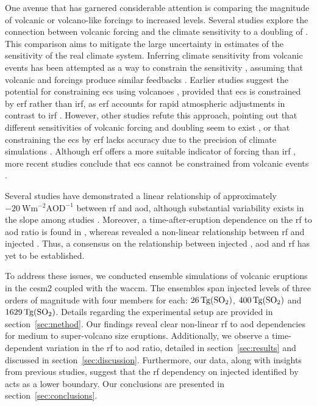\documentclass{ametsocV6.1}
\newcommand{\iso}[1][i]{{#1}njected \ce{SO2}}
\begin{document}
One avenue that has garnered considerable attention is comparing the magnitude of
volcanic or volcano-like forcings to increased  levels. Several studies explore
the connection between volcanic forcing and the climate sensitivity to a doubling of
\citep{boer2007,marvel2016,merlis2014,ollila2016,richardson2019,salvi2022,wigley2005}.
This comparison aims to mitigate the large uncertainty in estimates of the sensitivity
of the real climate system. Inferring climate sensitivity from volcanic events has been
attempted as a way to constrain the sensitivity \citep{boer2007}, assuming that volcanic
and  forcings produce similar feedbacks \citep{pauling2023}. Earlier studies
suggest the potential for constraining \gls{ecs} using volcanoes \citep{bender2010},
provided that \gls{ecs} is constrained by \gls{erf} rather than \gls{irf}, as \gls{erf}
accounts for rapid atmospheric adjustments in contrast to \gls{irf}
\citep{richardson2019}. However, other studies refute this approach, pointing out that
different sensitivities of volcanic forcing and  doubling seem to exist
\citep{douglass2006}, or that constraining the \gls{ecs} by \gls{erf} lacks accuracy due
to the precision of climate simulations \citep{boer2007,salvi2022}. Although \gls{erf}
offers a more suitable indicator of forcing than \gls{irf}
\citep{marvel2016,richardson2019}, more recent studies conclude that \gls{ecs} cannot be
constrained from volcanic events \citep{pauling2023}.

Several studies have demonstrated a linear relationship of approximately
\(-\SI{20}{\watt\metre^{-2}\mathrm{AOD}^{-1}}\) between \gls{rf} and \gls{aod}, although
substantial variability exists in the slope among studies
\citep{mills2017,hansen2005,gregory2016,marshall2020,pitari2016b}. Moreover, a
time-after-eruption dependence on the \gls{rf} to \gls{aod} ratio is found in
\citet{marshall2020}, whereas \citet{niemeier2015} revealed a non-linear relationship
between \gls{rf} and \iso{}. Thus, a consensus on the relationship between \iso{},
\gls{aod} and \gls{rf} has yet to be established.

To address these issues, we conducted ensemble simulations of volcanic eruptions in the
\gls{cesm2} coupled with the \gls{waccm}. The ensembles span \iso{} levels of three
orders of magnitude with four members for each: \(\SI{26}{\tera\gram(\ce{SO2})}\),
\(\SI{400}{\tera\gram(\ce{SO2})}\) and \(\SI{1629}{\tera\gram(\ce{SO2})}\). Details
regarding the experimental setup are provided in section~\ref{sec:method}. Our findings
reveal clear non-linear \gls{rf} to \gls{aod} dependencies for medium to super-volcano
size eruptions. Additionally, we observe a time-dependent variation in the \gls{rf} to
\gls{aod} ratio, detailed in section~\ref{sec:results} and discussed in
section~\ref{sec:discussion}. Furthermore, our data, along with insights from previous
studies, suggest that the \gls{rf} dependency on \iso{} identified by
\citet{niemeier2015} acts as a lower boundary. Our conclusions are presented in
section~\ref{sec:conclusions}.
\end{document}
